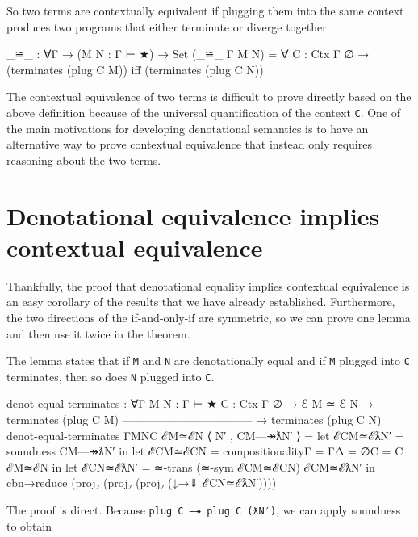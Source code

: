 So two terms are contextually equivalent if plugging them into the same
context produces two programs that either terminate or diverge together.

\begin{fence}
\begin{code}
_≅_ : ∀{Γ} → (M N : Γ ⊢ ★) → Set
(_≅_ {Γ} M N) = ∀ {C : Ctx Γ ∅}
                → (terminates (plug C M)) iff (terminates (plug C N))
\end{code}
\end{fence}

The contextual equivalence of two terms is difficult to prove directly
based on the above definition because of the universal quantification of
the context \texttt{C}. One of the main motivations for developing
denotational semantics is to have an alternative way to prove contextual
equivalence that instead only requires reasoning about the two terms.

\hypertarget{denotational-equivalence-implies-contextual-equivalence}{%
\section{Denotational equivalence implies contextual
equivalence}\label{denotational-equivalence-implies-contextual-equivalence}}

Thankfully, the proof that denotational equality implies contextual
equivalence is an easy corollary of the results that we have already
established. Furthermore, the two directions of the if-and-only-if are
symmetric, so we can prove one lemma and then use it twice in the
theorem.

The lemma states that if \texttt{M} and \texttt{N} are denotationally
equal and if \texttt{M} plugged into \texttt{C} terminates, then so does
\texttt{N} plugged into \texttt{C}.

\begin{fence}
\begin{code}
denot-equal-terminates : ∀{Γ} {M N : Γ ⊢ ★} {C : Ctx Γ ∅}
  → ℰ M ≃ ℰ N  →  terminates (plug C M)
    -----------------------------------
  → terminates (plug C N)
denot-equal-terminates {Γ}{M}{N}{C} ℰM≃ℰN ⟨ N′ , CM—↠ƛN′ ⟩ =
  let ℰCM≃ℰƛN′ = soundness CM—↠ƛN′ in
  let ℰCM≃ℰCN = compositionality{Γ = Γ}{Δ = ∅}{C = C} ℰM≃ℰN in
  let ℰCN≃ℰƛN′ = ≃-trans (≃-sym ℰCM≃ℰCN) ℰCM≃ℰƛN′ in
    cbn→reduce (proj₂ (proj₂ (proj₂ (↓→⇓ ℰCN≃ℰƛN′))))
\end{code}
\end{fence}

The proof is direct. Because \texttt{plug\ C\ —↠\ plug\ C\ (ƛN′)}, we
can apply soundness to obtain

